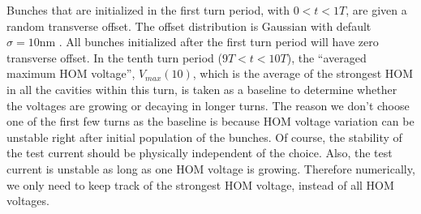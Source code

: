 \documentclass{hitec}
\begin{document}
Bunches that are initialized in the first turn period, with $0 < t <1T$, are given a random
transverse offset. The offset distribution is Gaussian with default $\sigma = 10 \text{nm}$ . All
bunches initialized after the first turn period will have zero transverse offset. In the tenth turn
period ($9T < t < 10T$), the ``averaged maximum HOM voltage'', $V_{max}(10)$, which is the average
of the strongest HOM in all the cavities within this turn, is taken as a baseline to determine
whether the voltages are growing or decaying in longer turns. The reason we don't choose one of the
first few turns as the baseline is because HOM voltage variation can be unstable right after initial
population of the bunches. Of course, the stability of the test current should be physically
independent of the choice. Also, the test current is unstable as long as one HOM voltage is
growing. Therefore numerically, we only need to keep track of the strongest HOM voltage, instead of
all HOM voltages.
\end{document}
